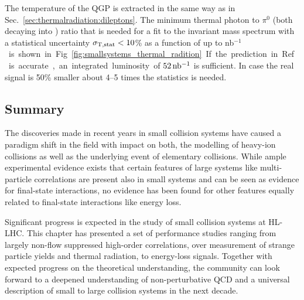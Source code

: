 \documentclass[../report.tex]{subfiles}
\begin{document}
The temperature of the QGP is extracted in the same way as in Sec.~\ref{sec:thermalradiation:dileptons}. The minimum thermal photon to $\pi^{0}$ (both decaying into \Pepem) ratio that is needed for a fit to the invariant mass spectrum with a statistical uncertainty $\sigma_{\rm T,stat} < 10$\% as a function of \Lint up to \unit[2000]{nb$^{-1}$} is shown in Fig.~\ref{fig:smallsystems_thermal_radition}. If the prediction in Ref.~\cite{RappPriv1} is accurate, an integrated luminosity of $\unit[52]{nb^{-1}}$ is sufficient. In case the real signal is 50\% smaller about 4--5 times the statistics is needed.

\subsection{Summary}

The discoveries made in recent years in small collision systems have caused a paradigm shift in the field with impact on both, the modelling of heavy-ion collisions as well as the underlying event of elementary \pp collisions. While ample experimental evidence exists that certain features of large systems like multi-particle correlations are present also in small systems and can be seen as evidence for final-state interactions, no evidence has been found for other features equally related to final-state interactions like energy loss. 

Significant progress is expected in the study of small collision systems at HL-LHC. This chapter has presented a set of performance studies ranging from largely non-flow suppressed high-order correlations, over measurement of strange particle yields and thermal radiation, to energy-loss signals. Together with expected progress on the theoretical understanding, the community can look forward to a deepened understanding of non-perturbative QCD and a universal description of small to large collision systems in the next decade.
\end{document}
